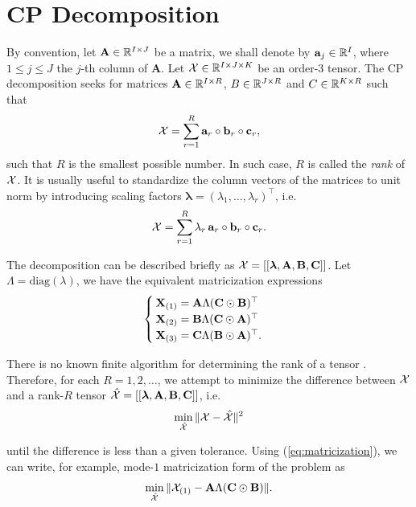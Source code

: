 \section{CP Decomposition}
By convention, let $\mathbf{A}\in{\mathbb{R}}^{I\times J}$ be a matrix, we shall denote by $\mathbf{a}_j \in {\mathbb{R}}^{I}$, where $1\le j \le J$ the $j$-th column of $\mathbf{A}$. Let $\mathcal{X}\in{\mathbb{R}}^{I\times J\times K}$ be an order-3 tensor. The CP decomposition seeks for matrices $\mathbf{A}\in{\mathbb{R}}^{I\times R}$, $B\in{\mathbb{R}}^{J\times R}$ and $C\in{\mathbb{R}}^{K\times R}$ such that
\begin{equation}
    \mathcal{X} = \sum\limits_{r=1}^{R} \mathbf{a}_r\circ \mathbf{b}_r \circ \mathbf{c}_r,
\end{equation}
such that $R$ is the smallest possible number. In such case, $R$ is called the \textit{rank} of $\mathcal{X}$. It is usually useful to standardize the column vectors of the matrices to unit norm by introducing scaling factors $\bm{\lambda} = (\lambda_1,\ldots,\lambda_r)^\top$, i.e.
\begin{equation}
    \mathcal{X} = \sum\limits_{r=1}^{R} \lambda_r\,\mathbf{a}_r\circ \mathbf{b}_r \circ \mathbf{c}_r.
\end{equation}

The decomposition can be described briefly as $\mathcal{X}=[[\bm{\lambda}, \mathbf{A}, \mathbf{B}, \mathbf{C}]]$. Let $\Lambda = \mathrm{diag}(\lambda)$, we have the equivalent matricization expressions
\begin{equation}
    \label{eq:matricization}
    \begin{cases}
        \mathbf{X}_{(1)} = \mathbf{A}\Lambda(\mathbf{C}\odot \mathbf{B})^\top \\
        \mathbf{X}_{(2)} = \mathbf{B}\Lambda(\mathbf{C}\odot \mathbf{A})^\top       \\
        \mathbf{X}_{(3)} = \mathbf{C}\Lambda(\mathbf{B}\odot \mathbf{A})^\top.
    \end{cases}
\end{equation}

There is no known finite algorithm for determining the rank of a tensor \cite{kruskal1989rank}. Therefore, for each $R=1,2,\ldots$, we attempt to minimize the difference between $\mathcal{X}$ and a rank-$R$ tensor $\hat{\mathcal{X}}=[[\bm{\lambda}, \mathbf{A}, \mathbf{B}, \mathbf{C}]]$, i.e.
\begin{equation}
    \min\limits_{\hat{\mathcal{X}}}\|\mathcal{X}-\hat{\mathcal{X}}\|^2
\end{equation}

until the difference is less than a given tolerance. Using (\ref{eq:matricization}), we can write, for example, mode-$1$ matricization form of the problem as
\begin{equation}
    \min\limits_{\hat{\mathcal{X}}}\|\mathcal{X}_{(1)} - \mathbf{A}\Lambda(\mathbf{C}\odot \mathbf{B})\|.
\end{equation}

